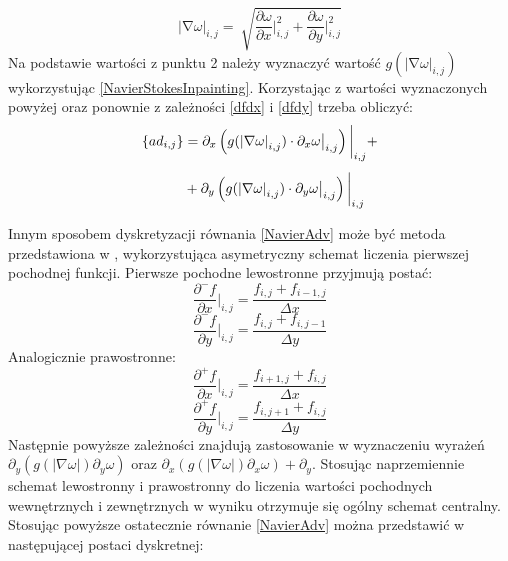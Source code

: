 \documentclass[12pt, twoside, openany]{report}
\theoremstyle{definition}
\begin{document}
\begin{equation}
{\left|\mathrm{\nabla }\omega \right|}_{i,j}=\ \sqrt{\frac{\partial \omega }{\partial x}\bigg|^2_{i,j}+\frac{\partial \omega }{\partial y}\bigg|^2_{i,j}}
\label{magnitudedw}
\end{equation}
Na podstawie wartości z punktu 2 należy wyznaczyć wartość $g{\left({\left|\mathrm{\nabla }\omega \right|}_{i,j}\right)}$ wykorzystując \eqref{NavierStokesInpainting}. Korzystając z wartości wyznaczonych powyżej oraz ponownie z zależności \eqref{dfdx} i \eqref{dfdy} trzeba obliczyć:
\begin{align}
\{ad_{i,j}\} &= \partial_x \left( g(\left| \nabla\omega \right|_{i,j}) \cdot \partial_x \omega \big|_{i,j} \right) \bigg|_{i,j} \notag +\\[1ex]
&+ \partial_y \left( g(\left|\nabla\omega\right|_{i,j}) \cdot \partial_y \omega \big|_{i,j} \right)\bigg|_{i,j}
\label{discreteAnisotropic}
\end{align}
\par
Innym sposobem dyskretyzacji równania \eqref{NavierAdv} może być metoda przedstawiona w \cite{van2005algorithms}, wykorzystująca asymetryczny schemat liczenia pierwszej pochodnej funkcji. Pierwsze pochodne lewostronne przyjmują postać:
\begin{equation}
\frac{\partial^-f}{\partial x}\bigg|_{i,j}=\frac{f_{i,j}+f_{i-1,j}}{\Delta x}
\label{leftdfdx}
\end{equation}
\begin{equation}
{\frac{{\partial }^-f}{\partial y}}\bigg|_{i,j}=\frac{f_{i,j}+f_{i,j-1}}{\Delta y}
\label{leftdfdy}
\end{equation}
Analogicznie prawostronne:
\begin{equation}
{\frac{{\partial }^+f}{\partial x}}\bigg|_{i,j}=\frac{f_{i+1,j}+f_{i,j}}{\Delta x} 
\label{rightdfdx}
\end{equation}
\begin{equation}
{\frac{{\partial }^+f}{\partial y}}\bigg|_{i,j}=\frac{f_{i,j+1}+f_{i,j}}{\Delta y}
\label{rightdfdy}
\end{equation}
Następnie powyższe zależności znajdują zastosowanie w wyznaczeniu wyrażeń\\ ${\partial }_y\left(g\left(\left|\nabla \omega \right|\right){\partial }_y\omega \right)$ oraz ${\partial }_x\left(g\left(\left|\nabla \omega \right|\right){\partial }_x\omega \right)+{\partial }_y$. Stosując naprzemiennie schemat lewostronny i prawostronny do liczenia wartości pochodnych wewnętrznych i zewnętrznych w wyniku otrzymuje się ogólny schemat centralny. Stosując powyższe ostatecznie równanie \eqref{NavierAdv} można przedstawić w następującej postaci dyskretnej:
\end{document}

